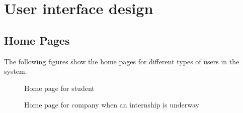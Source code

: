\chapter{User interface design}

\section{Home Pages}
The following figures show the home pages for different types of users in the system.

\begin{figure}[H]
    \centering
    \caption*{Home page for student}
\end{figure}

\begin{figure}[H]
    \centering
    \caption*{Home page for company when an internship is underway }
\end{figure}

